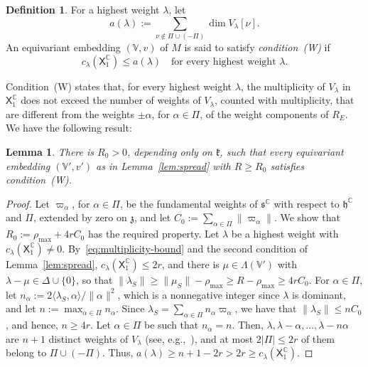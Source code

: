 \documentclass{article}
\newcommand{\C}{\mathbb{C}}
\newcommand{\frakk}{\mathfrak{k}}
\newcommand{\fraks}{\mathfrak{s}}
\newcommand{\frakz}{\mathfrak{z}}
\newcommand{\frakh}{\mathfrak{h}}
\newcommand{\sX}{\mathsf{X}}
\newtheorem{lemma}{Lemma}
\theoremstyle{definition}
\newtheorem{definition}{Definition}
\theoremstyle{plain}
\begin{document}
\begin{definition}\label{def:W}
For a highest weight $\lambda$, let
$$
a(\lambda):=\sum_{\nu\notin\Pi\cup(-\Pi)}\dim V_\lambda[\nu].
$$
An equivariant embedding $(\mathbb V,v)$ of $M$ is said to satisfy {\it condition~(W)} if
\begin{equation}\label{eq:condition-W}
c_\lambda(\sX_1^\C)\leq a(\lambda)\quad\mbox{for every highest weight }\lambda.
\end{equation}
\end{definition} 
Condition~(W) states that, for every highest weight $\lambda$, the multiplicity of $V_\lambda$ in $\sX_1^\C$ does not exceed the number of weights of $V_\lambda$, counted with multiplicity, that are different from the weights $\pm\alpha$, for $\alpha\in\Pi$, of the weight components of $R_E$.
We have the following result:

\begin{lemma}\label{lem:W}
There is $R_0>0$, depending only on $\frakk$, such that every equivariant embedding $(\mathbb V',v')$ as in Lemma~\ref{lem:spread} with $R\geq R_0$ satisfies condition~(W).
\end{lemma}

\begin{proof}
Let $\varpi_\alpha$, for $\alpha\in\Pi$, be the fundamental weights of $\fraks^\C$ with respect to $\frakh^\C$ and $\Pi$,
extended by zero on $\frakz$, and let $C_0:=\sum_{\alpha\in\Pi}\|\varpi_\alpha\|$.
We show that $R_0:=\rho_{\max}+4rC_0$ has the required property.
Let $\lambda$ be a highest weight with $c_\lambda(\sX_1^\C)\neq0$.
By~\eqref{eq:multiplicity-bound} and the second condition of Lemma~\ref{lem:spread}, $c_\lambda(\sX_1^\C)\leq2r$, and there is $\mu\in\Lambda(\mathbb V')$ with $\lambda-\mu\in\Delta\cup\{0\}$, so that $\|\lambda_S\|\geq\|\mu_S\|-\rho_{\max}\geq R-\rho_{\max}\geq4rC_0$.
For $\alpha\in\Pi$, let $n_\alpha:=2\langle\lambda_S,\alpha\rangle/\|\alpha\|^2$, which is a nonnegative integer since $\lambda$ is dominant, and let $n:=\max_{\alpha\in\Pi}n_\alpha$.
Since $\lambda_S=\sum_{\alpha\in\Pi}n_\alpha\varpi_\alpha$, we have that $\|\lambda_S\|\leq nC_0$, and hence, $n\geq4r$.
Let $\alpha\in\Pi$ be such that $n_\alpha=n$. Then, $\lambda,\lambda-\alpha,\ldots,\lambda-n\alpha$ are $n+1$ distinct weights of $V_\lambda$ (see,
    e.g.,~\cite[Section~21.3]{HumphreysLie}), and at most $2|\Pi|\leq2r$ of them belong to $\Pi\cup(-\Pi)$.
Thus, $a(\lambda)\geq n+1-2r>2r\geq c_\lambda(\sX_1^\C)$.
\end{proof}
\end{document}
